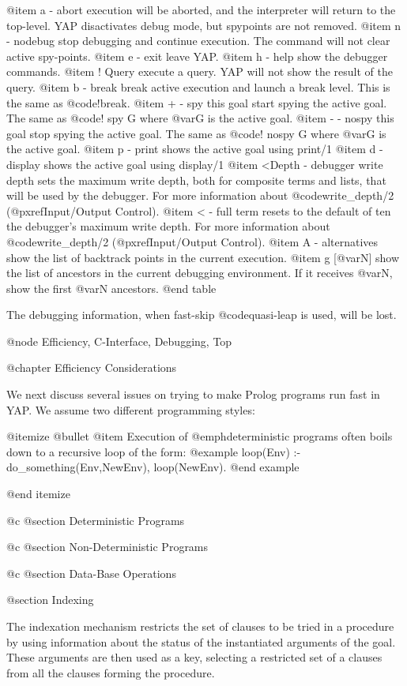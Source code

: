 @item a - abort
execution will be aborted, and the interpreter will return to the
top-level. YAP disactivates debug mode, but spypoints are not removed.
@item n - nodebug
stop debugging and continue execution. The command will not clear active
spy-points.
@item e - exit
leave YAP.
@item h - help
show the debugger commands.
@item ! Query
execute a query. YAP will not show the result of the query.
@item b - break
break active execution and launch a break level. This is  the same as @code{!break}.
@item + - spy this goal
start spying the active goal. The same as @code{! spy  G} where @var{G}
is the active goal.
@item - - nospy this goal
stop spying the active goal. The same as @code{! nospy G} where @var{G} is
the active goal.
@item p - print
shows the active goal using print/1
@item d - display
shows the active goal using display/1
@item <Depth - debugger write depth
sets the maximum write depth, both for composite terms and lists, that
will be used by the debugger. For more
information about @code{write_depth/2} (@pxref{Input/Output Control}).
@item < - full term
resets to the default of ten the debugger's maximum write depth. For
more information about @code{write_depth/2} (@pxref{Input/Output Control}).
@item A - alternatives
 show the list of backtrack points in the current execution. 
@item g [@var{N}] 
 show the list of ancestors in the current debugging environment. If it
 receives @var{N}, show the first @var{N} ancestors.
@end table

The debugging information, when fast-skip @code{quasi-leap} is used, will
be lost.

@node Efficiency, C-Interface, Debugging, Top

@chapter Efficiency Considerations

We next discuss several issues on trying to make Prolog programs run
fast in YAP. We assume two different programming styles:

@itemize @bullet
@item Execution of @emph{deterministic} programs often
boils down to a recursive loop of the form:
@example
loop(Env) :-
        do_something(Env,NewEnv),
        loop(NewEnv).
@end example

@end itemize

@c @section Deterministic Programs

@c @section Non-Deterministic Programs

@c @section Data-Base Operations

@section Indexing

The indexation mechanism restricts the set of clauses to be tried in a
procedure by using information about the status of the instantiated
arguments of the goal.  These arguments are then used as a key,
selecting a restricted set of a clauses from all the clauses forming the
procedure.


